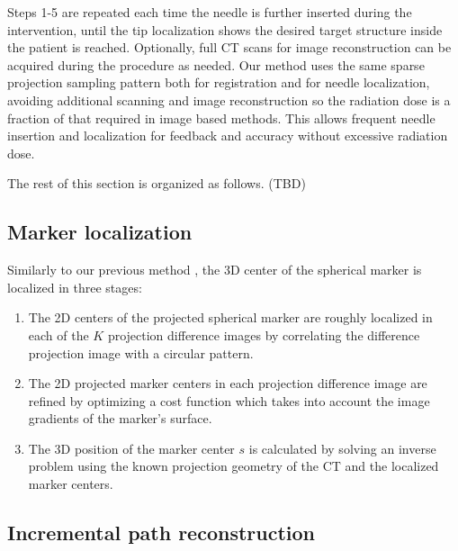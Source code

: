 \documentclass[letterpaper, 10 pt, conference]{ieeeconf}  %
\begin{document}
Steps 1-5 are repeated each time the needle is further inserted during the intervention, until the tip localization shows the desired target structure inside the patient is reached. Optionally, full CT scans for image reconstruction can be acquired during the procedure as needed. Our method uses the same sparse projection sampling pattern both for registration and for needle localization, avoiding additional scanning and image reconstruction so the radiation dose is a fraction of that required in image based methods. This allows frequent needle insertion and localization for feedback and accuracy without excessive radiation dose.

The rest of this section is organized as follows.
(TBD)


\subsection{Marker localization}
Similarly to our previous method \cite{medan2017reduced}, the 3D center of the spherical marker is localized in three stages:

\begin{enumerate}

\item The 2D centers of the projected spherical marker are roughly localized in each of the $K$ projection difference images by correlating the difference projection image with a circular pattern.

\item The 2D projected marker centers in each projection difference image are refined by optimizing a cost function which takes into account the image gradients of the marker's surface.

\item The 3D position of the marker center $s$ is calculated by solving an inverse problem using the known projection geometry of the CT and the localized marker centers.

\end{enumerate}

\subsection{Incremental path reconstruction}
\end{document}
